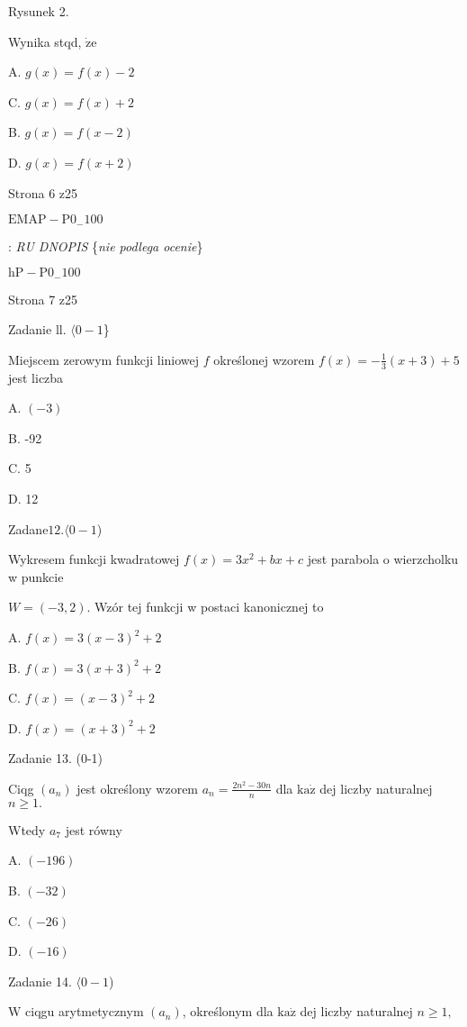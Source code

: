 \documentclass[a4paper,12pt]{article}
\begin{document}
Rysunek 2.

Wynika stqd, $\dot{\mathrm{z}}\mathrm{e}$

A. $g(x)=f(x)-2$

C. $g(x)=f(x)+2$

B. $g(x)=f(x-2)$

D. $g(x)=f(x+2)$

Strona 6 z25

$\mathrm{E}\mathrm{M}\mathrm{A}\mathrm{P}-\mathrm{P}0_{-}100$





: {\it RU DNOPIS} \{{\it nie podlega ocenie}\}

$\mathrm{h}\mathrm{P}-\mathrm{P}0_{-}100$

Strona 7 z25





Zadanie ll. $\langle 0-1$\}

Miejscem zerowym funkcji liniowej $f$ określonej wzorem $f(x)=-\displaystyle \frac{1}{3}(x+3)+5$ jest liczba

A. $(-3)$

B. -92

C. 5

D. 12

Zadan$\mathrm{e}12. \langle 0-1$)

Wykresem funkcji kwadratowej $f(x)=3x^{2}+bx+c$ jest parabola o wierzcholku w punkcie

$W=(-3,2)$. Wzór tej funkcji w postaci kanonicznej to

A. $f(x)=3(x-3)^{2}+2$

B. $f(x)=3(x+3)^{2}+2$

C. $f(x)=(x-3)^{2}+2$

D. $f(x)=(x+3)^{2}+2$

Zadanie 13. (0-1)

Ciqg $(a_{n})$ jest określony wzorem $a_{n}=\displaystyle \frac{2n^{2}-30n}{n}$ dla $\mathrm{k}\mathrm{a}\dot{\mathrm{z}}$ dej liczby naturalnej $n\geq 1.$

Wtedy $a_{7}$ jest równy

A. $(-196)$

B. $(-32)$

C. $(-26)$

D. $(-16)$

Zadanie 14. $\langle 0-1$)

$\mathrm{W}$ ciqgu arytmetycznym $(a_{n})$, określonym dla $\mathrm{k}\mathrm{a}\dot{\mathrm{z}}$ dej liczby naturalnej $n\geq 1,$
\end{document}
